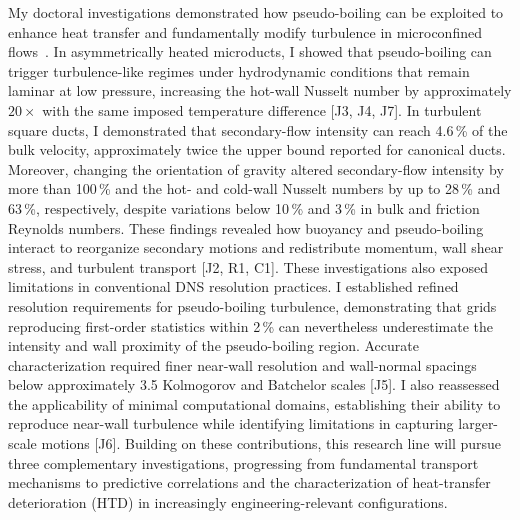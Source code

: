 \documentclass[11pt]{article}
\begin{document}
My doctoral investigations demonstrated how pseudo-boiling can be exploited to enhance heat transfer and fundamentally modify turbulence in microconfined flows~\cite{Hurtan2025,Bernades2023,Bernades2025}.
In asymmetrically heated microducts, I showed that pseudo-boiling can trigger turbulence-like regimes under hydrodynamic conditions that remain laminar at low pressure, increasing the hot-wall Nusselt number by approximately $20\times$ with the same imposed temperature difference [J3, J4, J7].
In turbulent square ducts, I demonstrated that secondary-flow intensity can reach 4.6\,\% of the bulk velocity, approximately twice the upper bound reported for canonical ducts.
Moreover, changing the orientation of gravity altered secondary-flow intensity by more than 100\,\% and the hot- and cold-wall Nusselt numbers by up to 28\,\% and 63\,\%, respectively, despite variations below 10\,\% and 3\,\% in bulk and friction Reynolds numbers.
These findings revealed how buoyancy and pseudo-boiling interact to reorganize secondary motions and redistribute momentum, wall shear stress, and turbulent transport [J2, R1, C1].
These investigations also exposed limitations in conventional DNS resolution practices.
I established refined resolution requirements for pseudo-boiling turbulence, demonstrating that grids reproducing first-order statistics within 2\,\% can nevertheless underestimate the intensity and wall proximity of the pseudo-boiling region.
Accurate characterization required finer near-wall resolution and wall-normal spacings below approximately 3.5 Kolmogorov and Batchelor scales [J5].
I also reassessed the applicability of minimal computational domains, establishing their ability to reproduce near-wall turbulence while identifying limitations in capturing larger-scale motions [J6].
Building on these contributions, this research line will pursue three complementary investigations, progressing from fundamental transport mechanisms to predictive correlations and the characterization of heat-transfer deterioration (HTD) in increasingly engineering-relevant configurations.
\end{document}
